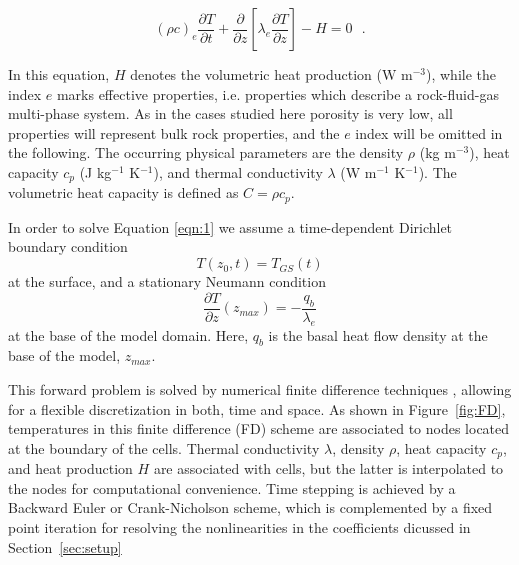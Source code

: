 \documentclass[cp]{copernicus}
\begin{document}
\begin{equation}\label{eqn:1}
 {\left( {\rho c} \right)_e}\frac{{\partial T}}{{\partial t}} + \frac{\partial 
}{{\partial z}}\left[ {{\lambda _e}\frac{{\partial T}}{{\partial z}}} \right] - 
H = 0{\text{ }.}
\end{equation} 

In this equation, $H$ denotes the volumetric heat production (W m$^{-3}$), while the index $e$ 
marks effective properties, i.e. properties which describe a rock-fluid-gas multi-phase system. As 
in the cases studied here porosity is very low, all properties will represent bulk rock properties, 
and the $e$ index will be omitted in the following. The occurring physical parameters are the 
density $\rho$ (kg m$^{-3}$), heat capacity $c_p$ (J kg$^{-1}$ K$^{-1}$), and thermal conductivity 
$\lambda$ (W m$^{-1}$ K$^{-1}$). The volumetric heat capacity is defined as $C = \rho c_p$. 

In order to solve Equation \ref{eqn:1} we assume a time-dependent Dirichlet boundary condition 
\begin{equation}\label{eqn:3a} 
T(z_0,t)=T_{GS}(t)
\end{equation} 
\noindent at the surface, and a stationary Neumann condition
\begin{equation}\label{eqn:3b}
\frac{\partial T}{\partial z}(z_{max }) =  - \frac{q_b}{\lambda_e}
\end{equation} 
\noindent at the base of the model domain. Here, $q_b$ is the basal heat flow density at the base 
 of the model, $z_{max}$. 
 
This forward problem is solved by numerical finite difference techniques 
\cite[e.g.,][]{Patankar1980a}, allowing for a flexible discretization in both, time and space. As 
shown in Figure~\ref{fig:FD}, temperatures in this finite difference (FD) scheme are associated 
to nodes located at the boundary of the cells. Thermal conductivity $\lambda$, density  $\rho$, 
heat capacity $c_p$, and heat production $H$ are associated with cells, but the latter is 
interpolated to the nodes for computational convenience. Time stepping is achieved by a Backward 
Euler or Crank-Nicholson scheme, which is complemented by a fixed point iteration for resolving the 
nonlinearities in the coefficients dicussed in Section~\ref{sec:setup}
\end{document}
